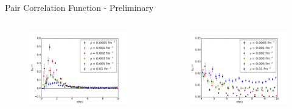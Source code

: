 \documentclass{beamer}
\begin{document}
\begin{frame}{Pair Correlation Function - Preliminary}
   \begin{columns}
   \begin{column}{0.6\textwidth}
   \begin{figure}[h]
      \centering
      \includegraphics[width=\textwidth]{gpp.png}
   \end{figure}
   \end{column}
   \begin{column}{0.6\textwidth}
   \begin{figure}[h]
      \centering
      \includegraphics[width=\textwidth]{gpp_small.png}
   \end{figure}
   \end{column}
   \end{columns}
\end{frame}

\fi
\end{document}
